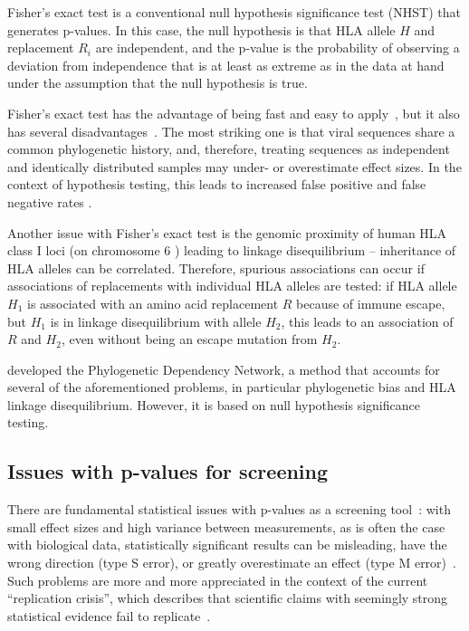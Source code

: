 \documentclass{bioinfo}
\begin{document}
Fisher's exact test is a conventional null hypothesis significance test (NHST) that generates p-values. In this case, the null hypothesis is that HLA allele \(H\) and  replacement \(R_{i}\) are independent, and the p-value is the probability of observing a deviation from independence that is at least as extreme as in the data at hand under the assumption that the null hypothesis is true.

Fisher's exact test has the advantage of being fast and easy to apply~\citep{Budeus2016}, but it also has several disadvantages~\citep{Carlson2008}. The most striking one is that viral sequences share a common phylogenetic history, and,  therefore, treating sequences as independent and identically distributed samples may under- or overestimate effect sizes. In the context of hypothesis testing, this leads to increased false positive and false negative rates \citep{Osborne2002, Scariano1987}.

Another issue with Fisher's exact test is the genomic proximity of human HLA class I loci (on chromosome 6 \citep{Francke1977}) leading to linkage disequilibrium -- inheritance of HLA alleles can be correlated. Therefore, spurious associations can occur if associations of replacements with individual HLA alleles are tested: if HLA allele \(H_1\) is associated with an amino acid replacement \(R\) because of immune escape, but \(H_1\) is in linkage disequilibrium with allele \(H_2\), this leads to an association of \(R\) and \(H_2\), even without being an escape mutation from $H_2$.

\citet{Carlson2008} developed the Phylogenetic Dependency Network, a method that accounts for several of the aforementioned problems, in particular phylogenetic bias and  HLA linkage disequilibrium. However, it is based on null hypothesis significance testing.

\subsection{Issues with p-values for screening}

There are fundamental statistical issues with p-values as a screening tool~\citep{Amrhein2017}:
with small effect sizes and high variance between measurements, as is often the case with biological data, statistically significant results can be misleading, have the wrong direction (type S error), or greatly overestimate an effect (type M error)~\citep{Gelman2014}. Such problems are more and more appreciated in the context of the current ``replication crisis'', which describes that scientific claims with seemingly strong statistical evidence fail to replicate~\citep{Ioannidis2005, Begley:2012, Baker2016Nature-reproducibility-crisis}.
\end{document}
